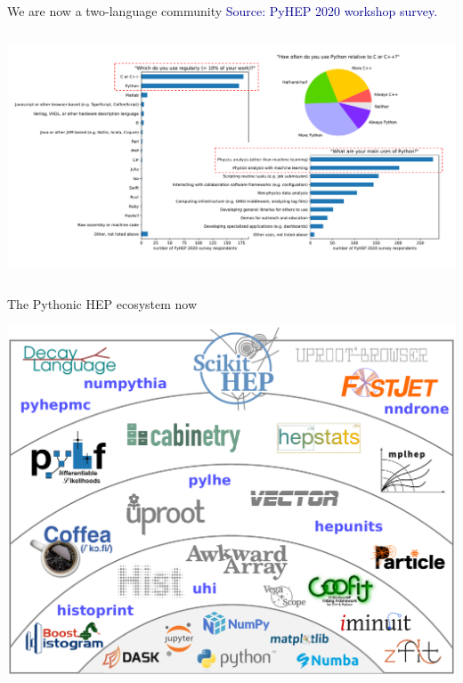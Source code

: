 \documentclass[aspectratio=169]{beamer}
\begin{document}
\begin{frame}{We are now a two-language community}
\vspace{0.25 cm}
\textcolor{darkblue}{Source: PyHEP 2020 workshop survey.}

\vspace{-0.3 cm}
\begin{columns}
\includegraphics[width=\linewidth]{PLOTS/pyhep2020-survey-5.pdf}
\end{columns}
\end{frame}

\begin{frame}{The Pythonic HEP ecosystem now}
\begin{center}
\includegraphics[width=0.72\linewidth]{PLOTS/shells-hep.pdf}
\end{center}
\end{frame}
\end{document}
